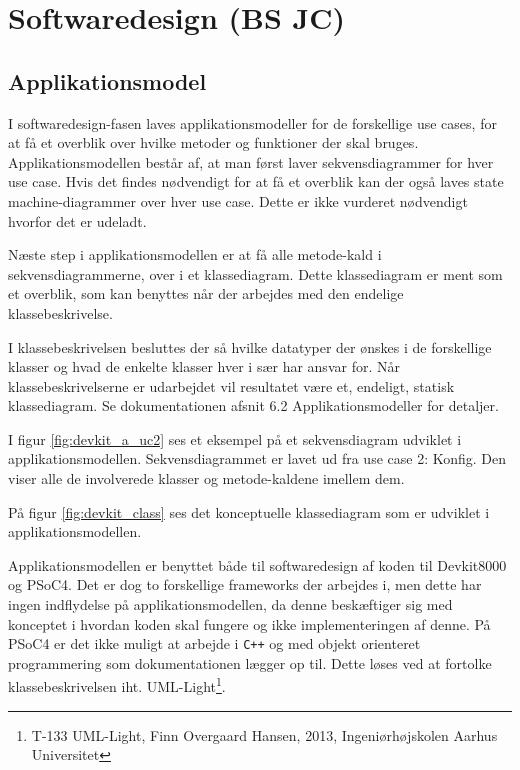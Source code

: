 \section{Softwaredesign (BS JC)}

\subsection{Applikationsmodel}
I softwaredesign-fasen laves applikationsmodeller for de forskellige use cases, for at få et overblik over hvilke metoder og funktioner der skal bruges. Applikationsmodellen består af, at man først laver sekvensdiagrammer for hver use case. Hvis det findes nødvendigt for at få et overblik kan der også laves state machine-diagrammer over hver use case. Dette er ikke vurderet nødvendigt hvorfor det er udeladt.

Næste step i applikationsmodellen er at få alle metode-kald i sekvensdiagrammerne, over i et klassediagram. Dette klassediagram er ment som et overblik, som kan benyttes når der arbejdes med den endelige klassebeskrivelse.

I klassebeskrivelsen besluttes der så hvilke datatyper der ønskes i de forskellige klasser og hvad de enkelte klasser hver i sær har ansvar for. Når klassebeskrivelserne er udarbejdet vil resultatet være et, endeligt, statisk klassediagram. Se dokumentationen afsnit 6.2 Applikationsmodeller for detaljer.


I figur \ref{fig:devkit_a_uc2} ses et eksempel på et sekvensdiagram udviklet i applikationsmodellen. Sekvensdiagrammet er lavet ud fra use case 2: Konfig. Den viser alle de involverede klasser og metode-kaldene imellem dem.

På figur \ref{fig:devkit_class} ses det konceptuelle klassediagram som er udviklet i applikationsmodellen.


Applikationsmodellen er benyttet både til softwaredesign af koden til Devkit8000 og PSoC4. Det er dog to forskellige frameworks der arbejdes i, men dette har ingen indflydelse på applikationsmodellen, da denne beskæftiger sig med konceptet i hvordan koden skal fungere og ikke implementeringen af denne. På PSoC4 er det ikke muligt at arbejde i \verb-C++- og med objekt orienteret programmering som dokumentationen lægger op til. Dette løses ved at fortolke klassebeskrivelsen iht. UML-Light\footnote{T-133 UML-Light, Finn Overgaard Hansen, 2013, Ingeniørhøjskolen Aarhus Universitet}.

